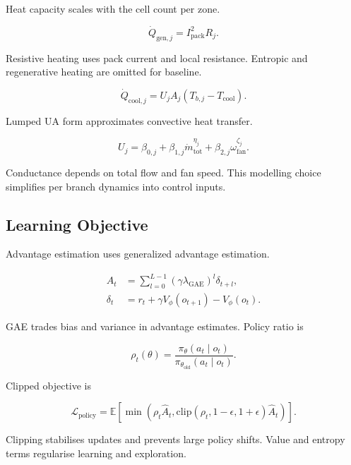 \documentclass{article}
\begin{document}
Heat capacity scales with the cell count per zone.

\begin{equation}
\dot Q_{\mathrm{gen},j} =
I_{\mathrm{pack}}^2 R_j.
\end{equation}

Resistive heating uses pack current and local resistance.
Entropic and regenerative heating are omitted for baseline.

\begin{equation}
\dot Q_{\mathrm{cool},j} =
U_j A_j (T_{b,j} - T_{\mathrm{cool}}).
\end{equation}

Lumped UA form approximates convective heat transfer.

\begin{equation}
U_j =
\beta_{0,j}
+
\beta_{1,j}\dot m_{\mathrm{tot}}^{\eta_j}
+
\beta_{2,j}\omega_{\mathrm{fan}}^{\zeta_j}.
\end{equation}

Conductance depends on total flow and fan speed.
This modelling choice simplifies per branch dynamics into control inputs.

\subsection{Learning Objective}

Advantage estimation uses generalized advantage estimation.

\begin{align}
\hat A_t &=
\sum_{l=0}^{L-1}
{(\gamma\lambda_{\mathrm{GAE}})}^l
\delta_{t+l},\\
\delta_t &=
r_t + \gamma V_{\phi}(o_{t+1})
- V_{\phi}(o_t).
\end{align}

GAE trades bias and variance in advantage estimates.
Policy ratio is

\begin{equation}
\rho_t(\theta) =
\frac{\pi_{\theta}(a_t \mid o_t)}
{\pi_{\theta_{\mathrm{old}}}(a_t \mid o_t)}.
\end{equation}

Clipped objective is

\begin{equation}
\mathcal{L}_{\mathrm{policy}} =
\mathbb{E}
\left[
\min
\left(
\rho_t \hat A_t,
\mathrm{clip}(\rho_t,1-\epsilon,1+\epsilon)\hat A_t
\right)
\right].
\end{equation}

Clipping stabilises updates and prevents large policy shifts.
Value and entropy terms regularise learning and exploration.
\end{document}
